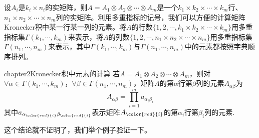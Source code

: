 设$A_{i}$是$k_{i}\times n_{i}$的实矩阵，则$A=A_{1}\otimes A_{2}\otimes \cdots\otimes A_{m}$是一个$k_{1}\times k_{2}\times\cdots\times k_{m}$行、$n_{1}\times n_{2}\times \cdots\times n_{m} $列的实矩阵。利用多重指标的记号，我们可以方便的计算矩阵Kronecker积中某一行某一列的元素。将$A$的行数$\{1,2,\cdots,k_{1}\times k_{2}\times\cdots\times k_{m} \}$用多重指标集$\Gamma(k_{1},\cdots,k_{m})$来表示，将$A$的列数$\{1,2,\cdots,n_{1}\times n_{2}\times\cdots\times n_{m} \}$用多重指标集$\Gamma(n_{1},\cdots,n_{m})$来表示，其中$\Gamma(k_{1},\cdots,k_{m})$与$\Gamma(n_{1},\cdots,n_{m})$中的元素都按照字典顺序排列。
\begin{mythm}{}{chapter2Kronecker积中元素的计算}
	若$A=A_{1}\otimes A_{2}\otimes \cdots\otimes A_{m}$，则对$\forall\alpha\in \Gamma(k_{1},\cdots,k_{m})$，$\forall\beta\in \Gamma(n_{1},\cdots,n_{m})$，矩阵$A$的第$\alpha$行第$\beta$列的元素$A_{\alpha\beta}$为
	\[
	A_{\alpha\beta}=\prod_{i=1}^{m}a_{\alpha_{ i }\beta_{ i }}
	\]
	其中$a_{\alpha_{ \color{red}{i} }\beta_{\color{red}{ i} }}$表示矩阵$A_{\color{red}{i}}$的第$\alpha_{ i }$行第$\beta_{ i }$列的元素.
\end{mythm}
这个结论就不证明了，我们举个例子验证一下。
